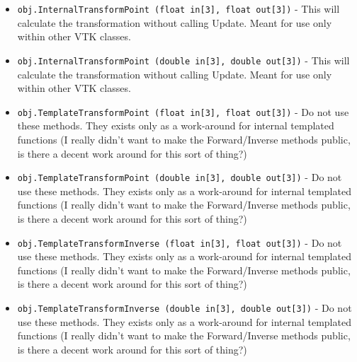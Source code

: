 \begin{itemize}
\item  \verb|obj.InternalTransformPoint (float in[3], float out[3])| -  This will calculate the transformation without calling Update.
 Meant for use only within other VTK classes.

\item  \verb|obj.InternalTransformPoint (double in[3], double out[3])| -  This will calculate the transformation without calling Update.
 Meant for use only within other VTK classes.

\item  \verb|obj.TemplateTransformPoint (float in[3], float out[3])| -  Do not use these methods.  They exists only as a work-around for
 internal templated functions (I really didn't want to make the
 Forward/Inverse methods public, is there a decent work around
 for this sort of thing?)

\item  \verb|obj.TemplateTransformPoint (double in[3], double out[3])| -  Do not use these methods.  They exists only as a work-around for
 internal templated functions (I really didn't want to make the
 Forward/Inverse methods public, is there a decent work around
 for this sort of thing?)

\item  \verb|obj.TemplateTransformInverse (float in[3], float out[3])| -  Do not use these methods.  They exists only as a work-around for
 internal templated functions (I really didn't want to make the
 Forward/Inverse methods public, is there a decent work around
 for this sort of thing?)

\item  \verb|obj.TemplateTransformInverse (double in[3], double out[3])| -  Do not use these methods.  They exists only as a work-around for
 internal templated functions (I really didn't want to make the
 Forward/Inverse methods public, is there a decent work around
 for this sort of thing?)

\end{itemize}
